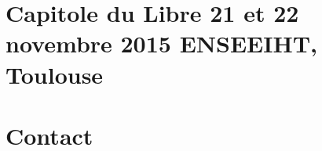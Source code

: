 \documentclass{cdl_sponsor}
\begin{document}

\section{Capitole du Libre {\small \textthreequartersemdash \/ 21 et 22 novembre 2015 \textthreequartersemdash \/ ENSEEIHT, Toulouse}}

	



\section{Contact}

	
\end{document}
